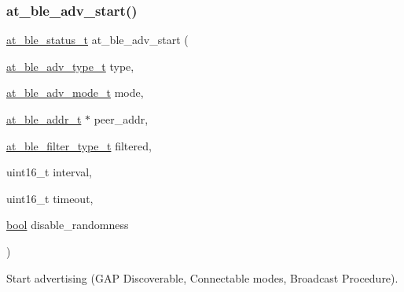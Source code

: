 \subsubsection{\texorpdfstring{at\_ble\_adv\_start()}{at\_ble\_adv\_start()}}
{\footnotesize\ttfamily \mbox{\hyperlink{group__error__codes__group_ga3b1db9b95feb157b3c188ca27fe76988}{at\+\_\+ble\+\_\+status\+\_\+t}} at\+\_\+ble\+\_\+adv\+\_\+start (\begin{DoxyParamCaption}\item[{\mbox{\hyperlink{at__ble__api_8h_a6c5e17c16e2d49e866f2f1effd646741}{at\+\_\+ble\+\_\+adv\+\_\+type\+\_\+t}}}]{type,  }\item[{\mbox{\hyperlink{at__ble__api_8h_a111d43782f9cab2913633e89a8fa7d42}{at\+\_\+ble\+\_\+adv\+\_\+mode\+\_\+t}}}]{mode,  }\item[{\mbox{\hyperlink{structat__ble__addr__t}{at\+\_\+ble\+\_\+addr\+\_\+t}} $\ast$}]{peer\+\_\+addr,  }\item[{\mbox{\hyperlink{at__ble__api_8h_ac1f9457ee534feed87551fc93f9d83d3}{at\+\_\+ble\+\_\+filter\+\_\+type\+\_\+t}}}]{filtered,  }\item[{uint16\+\_\+t}]{interval,  }\item[{uint16\+\_\+t}]{timeout,  }\item[{\mbox{\hyperlink{group__group__sam0__utils_ga97a80ca1602ebf2303258971a2c938e2}{bool}}}]{disable\+\_\+randomness }\end{DoxyParamCaption})}



Start advertising (G\+AP Discoverable, Connectable modes, Broadcast Procedure). 


